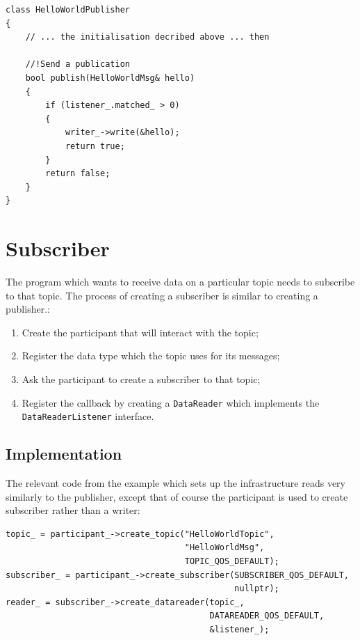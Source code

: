 \documentclass[12pt]{report}
\begin{document}
\begin{verbatim}
class HelloWorldPublisher
{
    // ... the initialisation decribed above ... then
    
    //!Send a publication
    bool publish(HelloWorldMsg& hello)
    {
        if (listener_.matched_ > 0)
        {
            writer_->write(&hello);
            return true;
        }
        return false;
    }
}
\end{verbatim}


\section{Subscriber}
The program which wants to receive data on a particular topic needs
to subscribe to that topic. The process of creating
a subscriber is similar to creating a publisher.:

\begin{enumerate}
 \item Create the participant that will interact with the topic;
 \item Register the data type which the topic uses for its messages;
 \item Ask the participant to create a subscriber to that topic;
 \item Register the callback by creating a \texttt{DataReader} which
  implements the \texttt{DataReaderListener} interface.
\end{enumerate}

\subsection{Implementation}
The relevant code from the example which sets up the infrastructure reads
very similarly to the publisher, except that of course the participant is used
to create subscriber rather than a writer:
\begin{verbatim}
topic_ = participant_->create_topic("HelloWorldTopic",
                                    "HelloWorldMsg",
                                    TOPIC_QOS_DEFAULT);
subscriber_ = participant_->create_subscriber(SUBSCRIBER_QOS_DEFAULT,
                                              nullptr);
reader_ = subscriber_->create_datareader(topic_,
                                         DATAREADER_QOS_DEFAULT,
                                         &listener_);
\end{verbatim}
\end{document}

